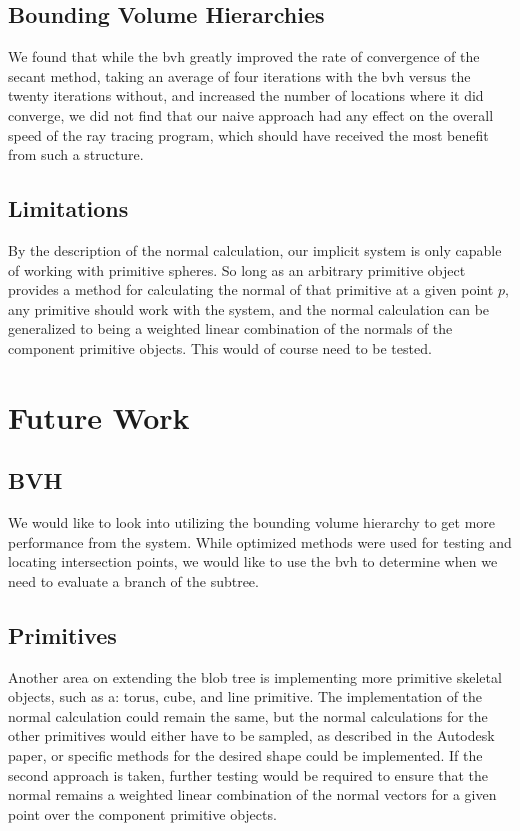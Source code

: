 \documentclass[conference]{acmsiggraph}
\begin{document}
\subsection{Bounding Volume Hierarchies}
We found that while the bvh greatly improved the rate of convergence of the
secant method, taking an average of four iterations with the bvh versus the
twenty iterations without, and increased the number of locations where it did
converge, we did not find that our naive approach had any effect on the overall
speed of the ray tracing program, which should have received the most benefit
from such a structure.

\subsection{Limitations}
By the description of the normal calculation, our implicit system is only
capable of working with primitive spheres. So long as an arbitrary  primitive
object provides a method for calculating the normal of that primitive at a
given point $p$, any primitive should work with the system, and the normal
calculation can be generalized to being a weighted linear combination of the
normals of the component primitive objects. This would of course need to be
tested.

\section{Future Work}
\subsection{BVH}
We would like to look into utilizing the bounding volume hierarchy to get more
performance from the system. While optimized methods were used for testing and
locating intersection points, we would like to use the bvh to determine when we
need to evaluate a branch of the subtree.

\subsection{Primitives}
Another area on extending the blob tree is implementing more primitive skeletal
objects, such as a: torus, cube, and line primitive. The implementation of the
normal calculation could remain the same, but the normal calculations for the
other primitives would either have to be sampled, as described in the Autodesk
paper, or specific methods for the desired shape could be implemented. If the
second approach is taken, further testing would be required to ensure that the
normal remains a weighted linear combination of the normal vectors for a given
point over the component primitive objects.
\end{document}
